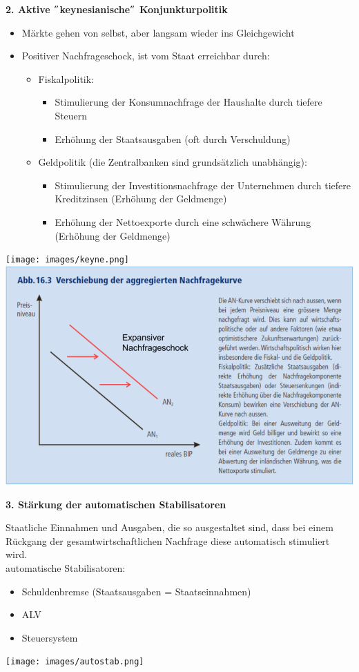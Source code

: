 \textbf{2. Aktive $"$keynesianische$"$ Konjunkturpolitik}\\
\begin{itemize}
	\item Märkte gehen von selbst, aber langsam wieder ins Gleichgewicht
	\item Positiver Nachfrageschock, ist vom Staat erreichbar durch:
	\begin{itemize}
		\item Fiskalpolitik:
		\begin{itemize}
			\item Stimulierung der Konsumnachfrage der Haushalte durch tiefere Steuern
			\item Erhöhung der Staatsausgaben (oft durch Verschuldung)
		\end{itemize}
		\item Geldpolitik (die Zentralbanken sind grundsätzlich unabhängig):
		\begin{itemize}
			\item Stimulierung der Investitionsnachfrage der Unternehmen durch tiefere Kreditzinsen (Erhöhung der Geldmenge)
			\item Erhöhung der Nettoexporte durch eine schwächere Währung (Erhöhung der Geldmenge)
		\end{itemize}
	\end{itemize}
\end{itemize}
\texttt{[image: images/keyne.png]}%
\includegraphics[width=0.5\linewidth]{images/keyne2.png}

\textbf{3. Stärkung der automatischen Stabilisatoren}\\
\begin{multicols}{2}
Staatliche Einnahmen und Ausgaben, die so ausgestaltet sind, dass bei einem Rückgang der gesamtwirtschaftlichen Nachfrage diese automatisch stimuliert wird.\\
\vspace{0.5cm}
automatische Stabilisatoren:
\begin{itemize}
	\item Schuldenbremse (Staatsausgaben = Staatseinnahmen)
	\item ALV
	\item Steuersystem
\end{itemize}
\vfill\null
\columnbreak
\texttt{[image: images/autostab.png]}	
\end{multicols}
\clearpage

